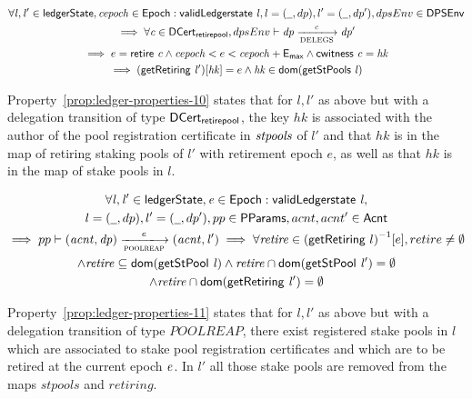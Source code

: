 \begin{property}
  \begin{multline*}
    \forall \var{l}, \var{l'} \in \ledgerState, \var{cepoch} \in \Epoch:
    \applyFun{validLedgerstate}{l},
    l = (\wcard, dp), l' = (\wcard, dp'), dpsEnv\in\DPSEnv \\
    \implies \forall \var{c} \in \DCertRetirePool, dpsEnv\vdash\var{dp}
    \trans{DELEGS}{c} \var{dp'} \\ \implies e = \applyFun{retire}{c} \wedge
    \var{cepoch} < e < \var{cepoch} + \emax \wedge \applyFun{cwitness}{c} =
    \var{hk}\\ \implies (\applyFun{getRetiring}{l'})[\var{hk}] = e \wedge
    \var{hk} \in \fun{dom}(\applyFun{getStPools}{l})
  \end{multline*}
  \label{prop:ledger-properties-10}
\end{property}

Property~\ref{prop:ledger-properties-10} states that for $l, l'$ as above but
with a delegation transition of type $\mathsf{DCert_{retirepool}}$, the key $hk$ is
associated with the author of the pool registration certificate in
$\mathit{stpools}$ of $l'$ and that $hk$ is in the map of retiring staking pools of
$l'$ with retirement epoch $e$, as well as that $hk$ is in the map of stake
pools in $l$.

\begin{property}
  \begin{multline*}
    \forall \var{l}, \var{l'} \in \ledgerState, \var{e} \in \Epoch:
    \applyFun{validLedgerstate}{l},\\
    l = (\wcard, dp), l' = (\wcard, dp'), pp\in\PParams, acnt, acnt'\in\Acnt \\
    \implies pp\vdash\var{(acnt, dp)} \trans{poolreap}{e} \var{(acnt, l')}
    \implies \forall \var{retire}\in{(\fun{getRetiring}~l)}^{-1}[e], retire \neq
    \emptyset \\ \wedge \var{retire} \subseteq
    \fun{dom}(\applyFun{getStPool}{l}) \wedge
    \var{retire} \cap\fun{dom}(\applyFun{getStPool}{l'})=\emptyset \\
    \wedge\var{retire} \cap \fun{dom}(\applyFun{getRetiring}{l'}) = \emptyset
  \end{multline*}
  \label{prop:ledger-properties-11}
\end{property}

Property~\ref{prop:ledger-properties-11} states that for $l, l'$ as above but
with a delegation transition of type $POOLREAP$, there exist registered stake
pools in $l$ which are associated to stake pool registration certificates and
which are to be retired at the current epoch $\mathit{e}$. In $l'$ all those stake
pools are removed from the maps $stpools$ and $retiring$.

